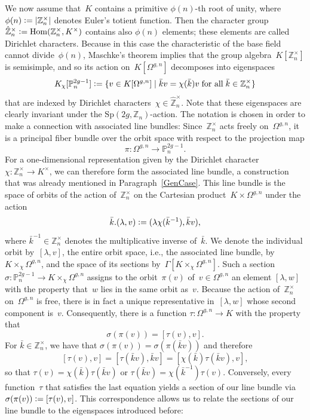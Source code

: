 \documentclass[12pt]{article}
\theoremstyle{definition}
\theoremstyle{break}
\newcommand{\Z}{\mathbb{Z}}
\DeclareMathOperator\Hom{Hom}
\newcommand{\Sp}{\mathrm{Sp}}
\renewcommand{\P}{\mathbb{P}}
\renewcommand{\1}{\mathbbm{1}}
\renewcommand{\P}{\mathbb{P}}
\newcommand{\deq}{\vcentcolon =}
\begin{document}
We now assume that~$K$ contains a primitive $\phi(n)$-th root of unity, where
\mbox{$\phi(n) \deq |\Z_n^\times|$} denotes Euler's totient function. Then the character group
$\hat{\Z}^\times_n \deq \Hom(\Z_n^\times, K^\times)$ contains also $\phi(n)$ elements; these elements are called Dirichlet characters. Because in this case the characteristic of the base field cannot divide~$\phi(n)$, Maschke's theorem implies that the group algebra~$K[\Z_n^\times]$ is semisimple, and so its action on~$K[\Omega^{g,n}]$ decomposes into eigenspaces
\[K_\chi[\P^{2g-1}_n] \deq \{v \in K[\Omega^{g,n}]
\mid \bar{k} v = \chi(\bar{k}) v \; \text{for all} \; \bar{k} \in \Z_n^\times\}\]
that are indexed by Dirichlet characters~$\chi \in \hat{\Z}^\times_n$. Note that these eigenspaces are clearly invariant under the $\Sp(2g, \Z_n)$-action. The notation is chosen in order to make a connection with associated line bundles: Since~$\Z_n^\times$ acts freely
on~$\Omega^{g,n}$, it is a principal fiber bundle over the orbit space with respect to the projection map
\[\pi \colon \Omega^{g,n} \to \P^{2g-1}_n.\]
For a one-dimensional representation given by the
Dirichlet character~$\chi \colon \Z_n^\times \to K^\times$, we can therefore form the associated line bundle, a construction that was already mentioned in Paragraph~\ref{GenCase}. This line bundle is the space of orbits of the action of~$\Z_n^\times$ on the
Cartesian product~$K \times \Omega^{g,n}$ under the action
\[\bar{k}.(\lambda,v) \deq (\lambda \chi(\bar{k}^{-1}),\bar{k} v),\]
where $\bar{k}^{-1} \in \Z_n^\times$ denotes the multiplicative inverse of~$\bar{k}$. We denote the individual orbit by~$[\lambda,v]$, the entire orbit space, i.e., the associated line bundle, by~$K \times_{\chi} \Omega^{g,n}$, and the space of its sections by~$\Gamma[K \times_{\chi} \Omega^{g,n}]$. Such a section $\sigma \colon \P^{2g-1}_n \to K \times_{\chi} \Omega^{g,n}$ assigns to the orbit~$\pi(v)$ of~$v \in \Omega^{g,n}$ an element $[\lambda,w]$ with the property that~$w$ lies in the same orbit as~$v$. Because the action of~$\Z_n^\times$ on~$\Omega^{g,n}$ is free, there is in fact a unique representative in~$[\lambda,w]$ whose second component is~$v$. Consequently, there is a function $\tau \colon \Omega^{g,n} \to K$ with the property that
\[\sigma(\pi(v)) = [\tau(v),v].\] For $\bar{k} \in \Z_n^\times$, we have that $\sigma(\pi(v)) = \sigma(\pi(\bar{k} v))$ and therefore
\[[\tau(v),v] = [\tau(\bar{k} v),\bar{k} v] = [\chi(\bar{k}) \tau(\bar{k} v), v],\]
so that $\tau(v) = \chi(\bar{k}) \tau(\bar{k} v)$ or $\tau(\bar{k} v) = \chi(\bar{k}^{-1}) \tau(v)$. Conversely, every function~$\tau$ that satisfies the last equation yields a section of our line bundle via \mbox{$\sigma(\pi(v)) \deq [\tau(v),v]$}. This correspondence allows us to relate the sections of our line bundle to the eigen\-spaces introduced before:
\end{document}
